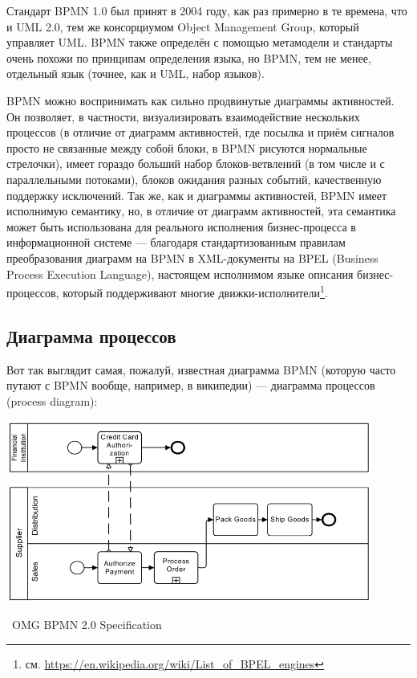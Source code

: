 \documentclass[a5paper]{article}
\newcommand{\attribution}[1] {
    \vspace{-4mm}\begin{flushright}\begin{scriptsize}%
    {\textcopyright\, #1}\end{scriptsize}\end{flushright}
}
\begin{document}
Стандарт BPMN 1.0 был принят в 2004 году, как раз примерно в те времена, что и UML 2.0, тем же консорциумом Object Management Group, который управляет UML. BPMN также определён с помощью метамодели и стандарты очень похожи по принципам определения языка, но BPMN, тем не менее, отдельный язык (точнее, как и UML, набор языков).

BPMN можно воспринимать как сильно продвинутые диаграммы активностей. Он позволяет, в частности, визуализировать взаимодействие нескольких процессов (в отличие от диаграмм активностей, где посылка и приём сигналов просто не связанные между собой блоки, в BPMN рисуются нормальные стрелочки), имеет гораздо больший набор блоков-ветвлений (в том числе и с параллельными потоками), блоков ожидания разных событий, качественную поддержку исключений. Так же, как и диаграммы активностей, BPMN имеет исполнимую семантику, но, в отличие от диаграмм активностей, эта семантика может быть использована для реального исполнения бизнес-процесса в информационной системе --- благодаря стандартизованным правилам преобразования диаграмм на BPMN в XML-документы на BPEL (Business Process Execution Language), настоящем исполнимом языке описания бизнес-процессов, который поддерживают многие движки-исполнители\footnote{см. \url{https://en.wikipedia.org/wiki/List_of_BPEL_engines}}.

\subsection{Диаграмма процессов}

Вот так выглядит самая, пожалуй, известная диаграмма BPMN (которую часто путают с BPMN вообще, например, в википедии) --- диаграмма процессов (process diagram):

\begin{center}
    \includegraphics[width=0.9\textwidth]{bpmnExample.png}
    \attribution{OMG BPMN 2.0 Specification}
\end{center}
\end{document}
